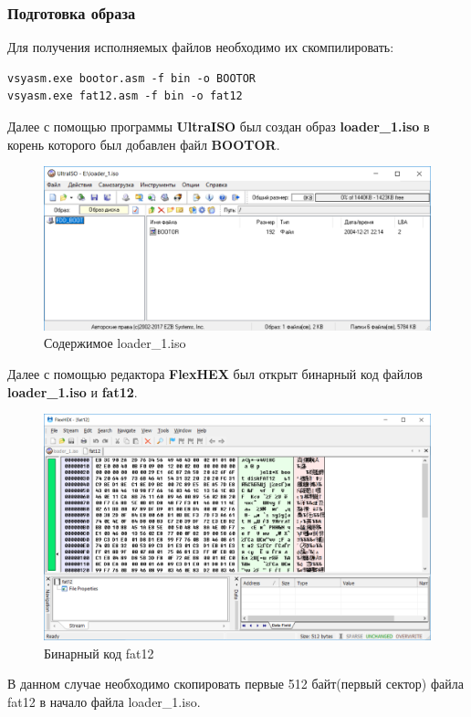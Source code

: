 \subsubsection{Подготовка образа}
Для получения исполняемых файлов необходимо их скомпилировать:
\begin{lstlisting}[language={}, caption={Компиляция ассемблерного кода}]
vsyasm.exe bootor.asm -f bin -o BOOTOR
vsyasm.exe fat12.asm -f bin -o fat12
\end{lstlisting}
Далее с помощью программы \textbf{UltraISO} был создан образ \textbf{loader\_1.iso}  в корень которого был добавлен файл \textbf{BOOTOR}.
\begin{figure}[H]
  \centering
  \includegraphics[width=\textwidth]{img/p2/1}
  \caption{Содержимое loader\_1.iso}
\end{figure}
Далее с помощью редактора \textbf{FlexHEX} был открыт бинарный код файлов \textbf{loader\_1.iso} и \textbf{fat12}.
\begin{figure}[H]
  \centering
  \includegraphics[width=\textwidth]{img/p2/2}
  \caption{Бинарный код fat12}
\end{figure}
В данном случае необходимо скопировать первые 512 байт(первый сектор) файла fat12 в начало файла loader\_1.iso.
